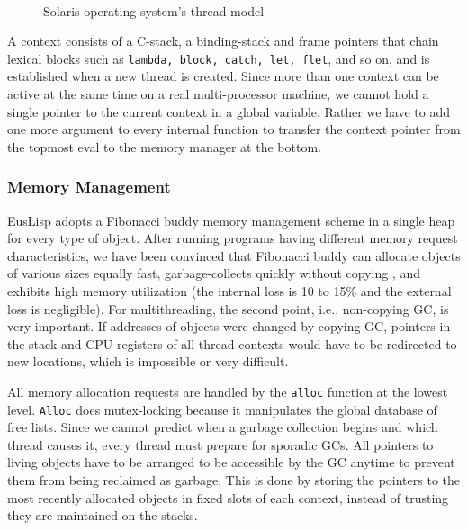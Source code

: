 \begin{figure}[b]
\begin{center}
\mbox{
\epsfxsize=10cm
}

\caption{Solaris operating system's thread model}\label{threadmodel}
\end{center}
\end{figure}

A context consists of a C-stack, a binding-stack and frame 
pointers that chain lexical blocks such as {\tt lambda, block, catch,
let, flet}, and so on,  and is established when a new thread
is created. Since more than one context can be active at
the same time on a real multi-processor machine, we cannot
hold a single pointer to the current context in a global variable.
Rather we have to add one more argument to every internal
function to transfer the context pointer  from the topmost eval
to the memory manager at the bottom.

\subsubsection{Memory Management}
EusLisp adopts a Fibonacci buddy memory management scheme in a
single heap for every type of object. 
After running programs having
different memory request characteristics, we have been convinced that
Fibonacci buddy can allocate objects of various sizes equally fast,
garbage-collects quickly without copying , and exhibits high memory
utilization (the internal loss is 10 to 15\% and the
external loss is negligible).
For multithreading, the second point, i.e., non-copying GC, is very
important.
If addresses of objects were changed by copying-GC, pointers in the
stack and CPU registers of all thread contexts would have to be
redirected to new locations, which is impossible or very difficult. 

All memory allocation requests are handled by the {\tt alloc} function at the
lowest level.
{\tt Alloc} does mutex-locking because it manipulates the global
database of free lists.
Since we cannot predict when a garbage
collection begins and which thread causes it, every thread must prepare
for sporadic GCs.  All pointers to living objects have to be arranged
to be accessible by the GC anytime to prevent them from being reclaimed
as garbage.  This is done by storing the pointers to the most recently
allocated objects in fixed slots of each context, instead of trusting
they are maintained on the stacks.

